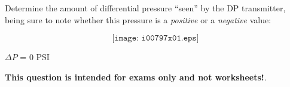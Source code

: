

Determine the amount of differential pressure ``seen'' by the DP transmitter, being sure to note whether this pressure is a {\it positive} or a {\it negative} value:

$$\texttt{[image: i00797x01.eps]}$$







$\Delta P$ = 0 PSI







{\bf This question is intended for exams only and not worksheets!}.



